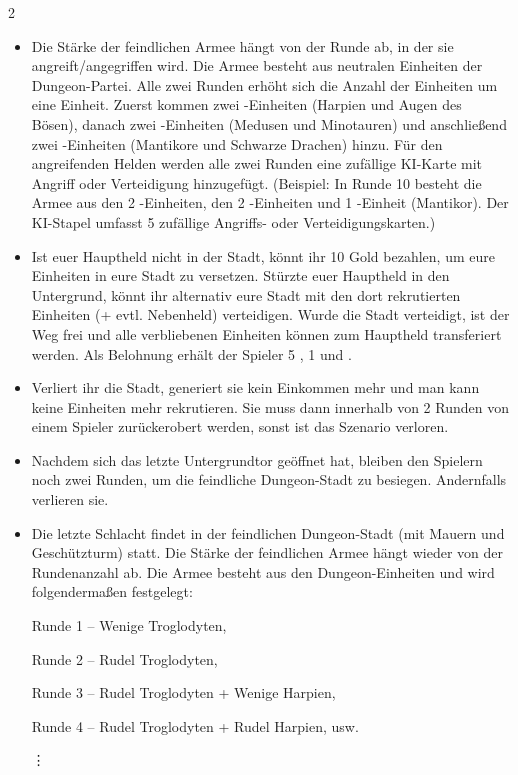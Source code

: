 \begin{multicols*}{2}
\begin{itemize}
\item Die Stärke der feindlichen Armee hängt von der Runde ab, in der sie angreift/angegriffen wird. Die Armee besteht aus neutralen Einheiten der Dungeon-Partei. Alle zwei Runden erhöht sich die Anzahl der Einheiten um eine Einheit. Zuerst kommen zwei -Einheiten (Harpien und Augen des Bösen), danach zwei -Einheiten (Medusen und Minotauren) und anschließend zwei -Einheiten (Mantikore und Schwarze Drachen) hinzu. Für den angreifenden Helden werden alle zwei Runden eine zufällige KI-Karte mit Angriff oder Verteidigung hinzugefügt. (Beispiel: In Runde 10 besteht die Armee aus den 2 -Einheiten, den 2 -Einheiten und 1 -Einheit (Mantikor). Der KI-Stapel umfasst 5 zufällige Angriffs- oder Verteidigungskarten.) 
\item Ist euer Hauptheld nicht in der Stadt, könnt ihr 10 Gold bezahlen, um eure Einheiten in eure Stadt zu versetzen. Stürzte euer Hauptheld in den Untergrund, könnt ihr alternativ eure Stadt mit den dort rekrutierten Einheiten (+ evtl. Nebenheld) verteidigen. Wurde die Stadt verteidigt, ist der Weg frei und alle verbliebenen Einheiten können zum Hauptheld transferiert werden. Als Belohnung erhält der Spieler 5 , 1  und .
\item Verliert ihr die Stadt, generiert sie kein Einkommen mehr und man kann keine Einheiten mehr rekrutieren. Sie muss dann innerhalb von 2 Runden von einem Spieler zurückerobert werden, sonst ist das Szenario verloren.
\item Nachdem sich das letzte Untergrundtor geöffnet hat, bleiben den Spielern noch zwei Runden, um die feindliche Dungeon-Stadt zu besiegen. Andernfalls verlieren sie. 
\item Die letzte Schlacht findet in der feindlichen Dungeon-Stadt (mit Mauern und Geschützturm) statt. Die Stärke der feindlichen Armee hängt wieder von der Rundenanzahl ab. Die Armee besteht aus den Dungeon-Einheiten und wird folgendermaßen festgelegt: 

Runde 1 -- Wenige  Troglodyten, 

Runde 2 -- Rudel  Troglodyten, 

Runde 3 -- Rudel  Troglodyten + Wenige  Harpien, 

Runde 4 -- Rudel  Troglodyten + Rudel  Harpien, usw.

\hspace{1em}\vdots


\end{itemize}
\end{multicols*}
